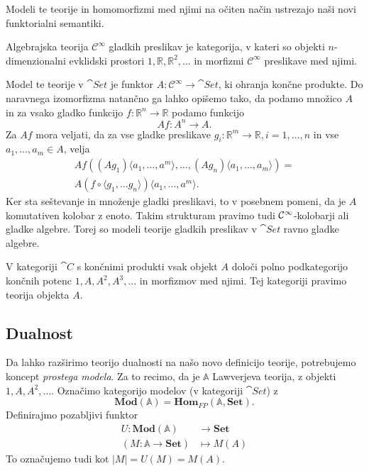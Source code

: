 \documentclass[../kategoricna_logika.tex]{subfiles}
\begin{document}
Modeli te teorije in homomorfizmi med njimi na očiten način ustrezajo naši novi
funktorialni semantiki.
\begin{primer}
Algebrajska teorija \(\mathcal{C}^{\infty}\) gladkih preslikav je kategorija,
v kateri so objekti $n$-dimenzionalni evklidski prostori \(1, \mathbb{R}, \mathbb{R}^2, \ldots\)
in morfizmi \(\mathcal{C}^{\infty}\) preslikave med njimi.

Model te teorije v \(\cat{Set}\) je funktor \(A : \mathcal{C}^{\infty} \to \cat{Set}\),
ki ohranja končne produkte. Do naravnega izomorfizma natančno ga lahko opišemo tako, da
podamo množico \(A\) in za vsako gladko funkcijo \(f : \mathbb{R}^n \to \mathbb{R}\)
podamo funkcijo
\[Af : A^n \to A.\]
Za \(Af\) mora veljati, da za vse gladke preslikave
\(g_i : \mathbb{R}^m \to \mathbb{R}, i = 1, \ldots, n\) in vse \(a_1, \ldots, a_m \in A\),
velja
\begin{multline}
   Af \left( (Ag_1)\langle a_1, \ldots, a^m \rangle, \ldots, (Ag_n)\langle a_1, \ldots, a_m \rangle \right) = \\
   A(f \circ \langle g_1, \ldots g_n \rangle)\langle a_1, \ldots, a^m \rangle.
\end{multline}   
Ker sta seštevanje in množenje gladki preslikavi, to v posebnem pomeni,
da je \(A\) komutativen kolobar z enoto.
Takim strukturam pravimo tudi $\mathcal{C}\textsuperscript{\(\infty\)}$-kolobarji
ali gladke algebre. Torej so modeli teorije gladkih preslikav v $\cat{Set}$ ravno gladke algebre.
\end{primer}
%
\begin{primer}
V kategoriji \(\cat{C}\) s končnimi produkti vsak objekt \(A\) določi polno podkategorijo
končnih potenc \(1, A, A^2, A^3, \ldots\) in morfizmov med njimi. Tej kategoriji
pravimo teorija objekta \(A\).
\end{primer}
\subsection{Dualnost}
\label{sec:orgef98ac4}
Da lahko razširimo teorijo dualnosti na našo novo definicijo teorije, potrebujemo
koncept \emph{prostega modela}. Za to recimo, da je \(\mathbb{A}\) Lawverjeva teorija,
z objekti \(1, A, A^2, \ldots\). Označimo kategorijo modelov (v kategoriji $\cat{Set}$) z
\[ \mathbf{Mod}(\mathbb{A}) = \mathbf{Hom}_{FP}(\mathbb{A}, \mathbf{Set}). \]
Definirajmo pozabljivi funktor
\begin{align*}
U : \mathbf{Mod}(\mathbb{A}) &\to \mathbf{Set} \\
(M : \mathbb{A} \to \mathbf{Set}) &\mapsto M(A)
\end{align*}
To označujemo tudi kot \(|M| = U(M) = M(A)\).
\end{document}
